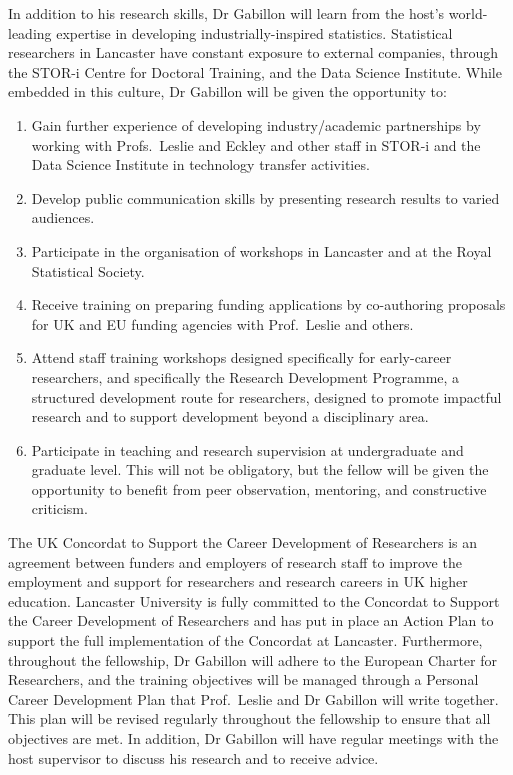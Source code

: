\documentclass[a4paper,11pt]{article}
\begin{document}
In addition to his research skills, Dr Gabillon will learn from the host's world-leading expertise in developing industrially-inspired statistics.  Statistical researchers in Lancaster have constant exposure to external companies, through the STOR-i Centre for Doctoral Training, and the Data Science Institute.  While embedded in this culture, Dr Gabillon will be given the opportunity to:
\begin{enumerate}
\item Gain further experience of developing industry/academic partnerships by working with Profs.\ Leslie and Eckley and other staff in STOR-i and the Data Science Institute in technology transfer activities.
\item Develop public communication skills by presenting research results to varied audiences.
\item Participate in the organisation of workshops in Lancaster and at the Royal Statistical Society.
\item Receive training on preparing funding applications by co-authoring proposals for UK and EU funding agencies with Prof.\ Leslie and others.
\item Attend staff training workshops designed specifically for early-career researchers, and specifically the Research Development Programme, a structured development route for researchers, designed to promote impactful research and to support development beyond a disciplinary area.
\item Participate in teaching and research supervision at undergraduate and graduate level.  This will not be obligatory, but the fellow will be given the opportunity to benefit from peer observation, mentoring, and constructive criticism.
\end{enumerate}

The UK Concordat to Support the Career Development of Researchers is an agreement between funders and employers of research staff to improve the employment and support for researchers and research careers in UK higher education.  Lancaster University is fully committed to the Concordat to Support the Career Development of Researchers and has put in place an Action Plan to support the full implementation of the Concordat at Lancaster.  Furthermore, throughout the fellowship, Dr Gabillon will adhere to the European Charter for Researchers, and the training objectives will be managed through a Personal Career Development Plan that Prof.\ Leslie and Dr Gabillon will write together.  This plan will be revised regularly throughout the fellowship to ensure that all objectives are met.  In addition, Dr Gabillon will have regular meetings with the host supervisor to discuss his research and to receive advice.
\end{document}
